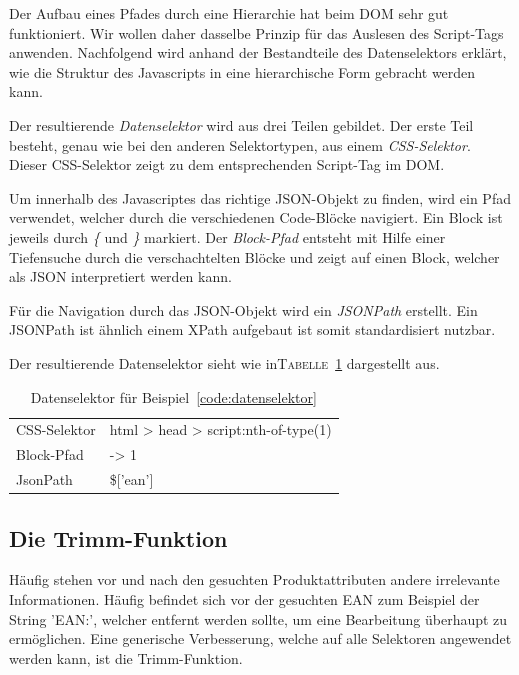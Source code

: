 Der Aufbau eines Pfades durch eine Hierarchie hat beim DOM sehr gut funktioniert.
Wir wollen daher dasselbe Prinzip für das Auslesen des Script-Tags anwenden.
Nachfolgend wird anhand der Bestandteile des Datenselektors erklärt, wie die Struktur des Javascripts in eine
hierarchische Form gebracht werden kann.

Der resultierende \textit{Datenselektor} wird aus drei Teilen gebildet.
Der erste Teil besteht, genau wie bei den anderen Selektortypen, aus einem \textit{CSS-Selektor}.
Dieser CSS-Selektor zeigt zu dem entsprechenden Script-Tag im DOM\@.

Um innerhalb des Javascriptes das richtige JSON-Objekt zu finden, wird ein Pfad verwendet, welcher durch die
verschiedenen Code-Blöcke navigiert.
Ein Block ist jeweils durch \textit{\{} und \textit{\}} markiert.
Der \textit{Block-Pfad} entsteht mit Hilfe einer Tiefensuche durch die verschachtelten Blöcke und zeigt auf einen
Block, welcher als JSON interpretiert werden kann.

Für die Navigation durch das JSON-Objekt wird ein \textit{JSONPath} erstellt.
Ein JSONPath ist ähnlich einem XPath aufgebaut ist somit standardisiert nutzbar.

Der resultierende Datenselektor sieht wie in\textsc{Tabelle}~\ref{tab:datenselektor} dargestellt aus.

\begin{table}[h]
    \centering
    \begin{tabular}{ l | l }
        CSS-Selektor &  html > head > script:nth-of-type(1)\\
        Block-Pfad   &  -> 1\\
        JsonPath     &  \$['ean']
    \end{tabular}
    \caption{Datenselektor für Beispiel~\ref{code:datenselektor}}
    \label{tab:datenselektor}
\end{table}
\vspace{-0.8cm}

\subsection{Die Trimm-Funktion}
\label{subsec:trimming-funktion}

Häufig stehen vor und nach den gesuchten Produktattributen andere irrelevante Informationen.
Häufig befindet sich vor der gesuchten EAN zum Beispiel der String 'EAN:\textvisiblespace', welcher entfernt
werden sollte, um eine Bearbeitung überhaupt zu ermöglichen.
Eine generische Verbesserung, welche auf alle Selektoren angewendet werden kann, ist die Trimm-Funktion.

